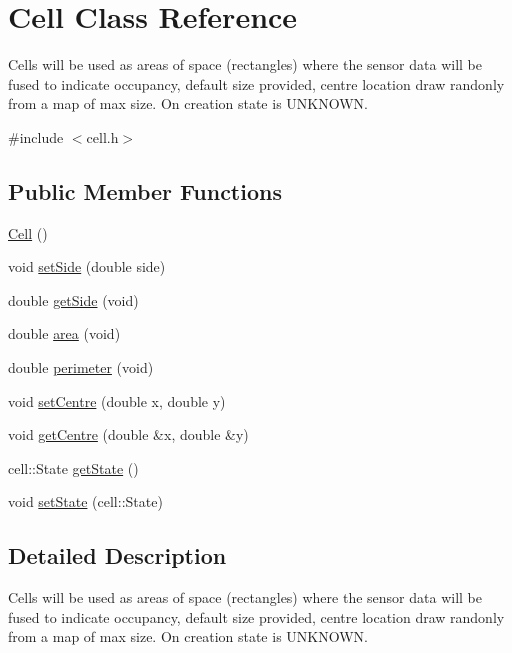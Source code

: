 \hypertarget{classCell}{}\section{Cell Class Reference}
\label{classCell}


Cells will be used as areas of space (rectangles) where the sensor data will be fused to indicate occupancy, default size provided, centre location draw randonly from a map of max size. On creation state is U\+N\+K\+N\+O\+WN.  




{\ttfamily \#include $<$cell.\+h$>$}

\subsection*{Public Member Functions}
\begin{DoxyCompactItemize}
\item 
\hyperlink{classCell_a394510643e8664cf12b5efaf5cb99f71}{Cell} ()
\item 
void \hyperlink{classCell_a9c4fd400ffbf61fe18073f3b244614ab}{set\+Side} (double side)
\item 
double \hyperlink{classCell_a8369e6773b462215ea3c13d216621cb7}{get\+Side} (void)
\item 
double \hyperlink{classCell_ad4fa31d97490fac2a1d11f3afaea4e67}{area} (void)
\item 
double \hyperlink{classCell_af02495b8e758ee82478134fd491f3e13}{perimeter} (void)
\item 
void \hyperlink{classCell_a882f75366d9cf6477d1fd7f9dd54519b}{set\+Centre} (double x, double y)
\item 
void \hyperlink{classCell_a1087822ba50d7afea999824cca8cc1f4}{get\+Centre} (double \&x, double \&y)
\item 
cell\+::\+State \hyperlink{classCell_aba131004c3f0bade13ef1b72e5694885}{get\+State} ()
\item 
void \hyperlink{classCell_adeb7a033171fa07557e756f3fcc4717d}{set\+State} (cell\+::\+State)
\end{DoxyCompactItemize}


\subsection{Detailed Description}
Cells will be used as areas of space (rectangles) where the sensor data will be fused to indicate occupancy, default size provided, centre location draw randonly from a map of max size. On creation state is U\+N\+K\+N\+O\+WN. 

